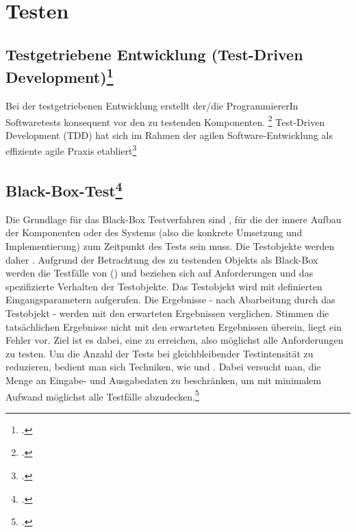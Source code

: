 \documentclass{bschlangaul-theorie}
\begin{document}
\let\b=\bBedingung
\let\c=\bKontrollCode
\let\f=\bBedingungFalsch
\let\k=\bKontrollTextzeileKnoten
\let\p=\bKontrollKnotenPfad
\let\w=\bBedingungWahr


\chapter{Testen}

\begin{bQuellen}
\item \cite[Kapitel 4 „Software-Text“; Seite 157-246]{hoffmann:software}
\end{bQuellen}

\section{Testgetriebene Entwicklung (Test-Driven
Development)\footcite[Kaptiel 5.7 Seite 150-145]{schatten}}

Bei der testgetriebenen Entwicklung erstellt der/die ProgrammiererIn
Softwaretests konsequent vor den zu testenden Komponenten.
\footcite{wiki:testgetriebene-entwicklung}
Test-Driven Development (TDD) hat sich im Rahmen der agilen
Software-Entwicklung als effiziente agile Praxis etabliert\footcite[Seite
151]{schatten}

%

\section{Black-Box-Test\footcite[Seite 32]{sosy:fs:5}}

Die Grundlage für das Black-Box Testverfahren sind , für die der innere Aufbau der Komponenten oder des
Systems (also die konkrete Umsetzung und Implementierung) zum Zeitpunkt
des Tests  sein muss. Die Testobjekte werden daher
. Aufgrund der
Betrachtung des zu testenden Objekts als Black-Box werden die Testfälle
von  () und beziehen sich auf
Anforderungen und das spezifizierte Verhalten der Testobjekte. Das
Testobjekt wird mit definierten Eingangsparametern aufgerufen. Die
Ergebnisse - nach Abarbeitung durch das Testobjekt - werden mit den
erwarteten Ergebnissen verglichen. Stimmen die tatsächlichen Ergebnisse
nicht mit den erwarteten Ergebnissen überein, liegt ein Fehler vor. Ziel
ist es dabei, eine  zu
erreichen, also möglichst alle Anforderungen zu testen. Um die Anzahl
der Tests bei gleichbleibender Testintensität zu reduzieren, bedient man
sich Techniken, wie  und
. Dabei versucht man, die Menge an Eingabe- und
Ausgabedaten zu beschränken, um mit minimalem Aufwand möglichst alle
Testfälle abzudecken.\footcite[Seite 140-141]{schatten}
\end{document}
